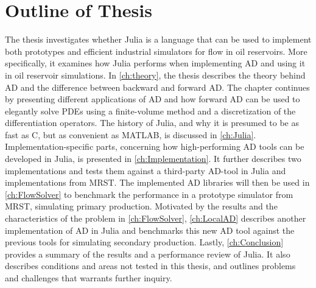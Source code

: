 \section{Outline of Thesis}
The thesis investigates whether Julia is a language that can be used to implement both prototypes and efficient industrial simulators for flow in oil reservoirs. More specifically, it examines how Julia performs when implementing AD and using it in oil reservoir simulations. In \autoref{ch:theory}, the thesis describes the theory behind AD and the difference between backward and forward AD. The chapter continues by presenting different applications of AD and how 
forward AD can be used to elegantly solve PDEs using a finite-volume method and a discretization of the differentiation operators. The history of Julia, and why it is presumed to be as fast as C, but as convenient as MATLAB, is discussed in \autoref{ch:Julia}. Implementation-specific parts, concerning how high-performing AD tools can be developed in Julia, is presented in \autoref{ch:Implementation}. It further describes two implementations and tests them against a third-party AD-tool in Julia and implementations from MRST. The implemented AD libraries will then be used in \autoref{ch:FlowSolver} to benchmark the performance in a prototype simulator from MRST, simulating primary production. Motivated by the results and the characteristics of the problem in \autoref{ch:FlowSolver}, \autoref{ch:LocalAD} describes another implementation of AD in Julia and benchmarks this new AD tool against the previous tools for simulating secondary production. Lastly, \autoref{ch:Conclusion} provides a summary of the results and a performance review of Julia. It also describes conditions and areas not tested in this thesis, and outlines problems and challenges that warrants further inquiry.